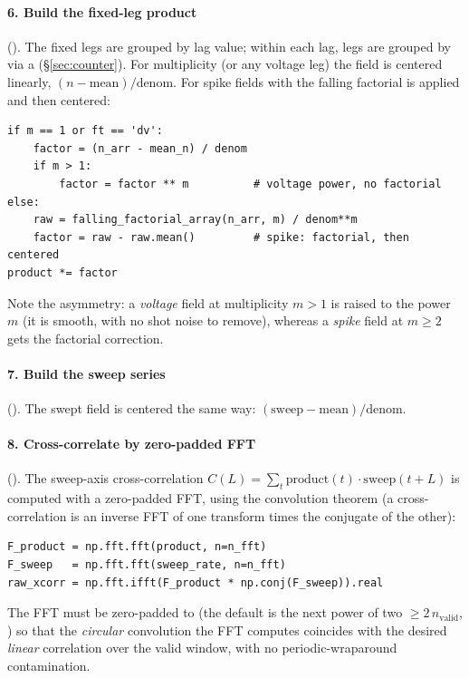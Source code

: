 \paragraph{6. Build the fixed-leg product} ().
The fixed legs are grouped by lag value; within each lag, legs are grouped by
 via a  (\S\ref{sec:counter}). For multiplicity
 (or any voltage leg) the field is centered linearly,
$(n - \text{mean})/\text{denom}$. For spike fields with  the falling
factorial is applied and then centered:

\begin{lstlisting}
if m == 1 or ft == 'dv':
    factor = (n_arr - mean_n) / denom
    if m > 1:
        factor = factor ** m          # voltage power, no factorial
else:
    raw = falling_factorial_array(n_arr, m) / denom**m
    factor = raw - raw.mean()         # spike: factorial, then centered
product *= factor
\end{lstlisting}

Note the asymmetry: a \emph{voltage} field at multiplicity $m>1$ is raised to the
power $m$ (it is smooth, with no shot noise to remove), whereas a \emph{spike}
field at $m \ge 2$ gets the factorial correction.

\paragraph{7. Build the sweep series} ().
The swept field is centered the same way: $(\text{sweep} - \text{mean})/
\text{denom}$.

\paragraph{8. Cross-correlate by zero-padded FFT}
(). The sweep-axis cross-correlation
$C(L) = \sum_t \text{product}(t)\cdot\text{sweep}(t+L)$ is computed with a
zero-padded FFT, using the convolution theorem (a cross-correlation is an inverse
FFT of one transform times the conjugate of the other):

\begin{lstlisting}
F_product = np.fft.fft(product, n=n_fft)
F_sweep   = np.fft.fft(sweep_rate, n=n_fft)
raw_xcorr = np.fft.ifft(F_product * np.conj(F_sweep)).real
\end{lstlisting}

The FFT must be zero-padded to  (the default is the next
power of two $\ge 2\,n_{\mathrm{valid}}$, )
so that the \emph{circular} convolution the FFT computes coincides with the desired
\emph{linear} correlation over the valid window, with no periodic-wraparound
contamination.

